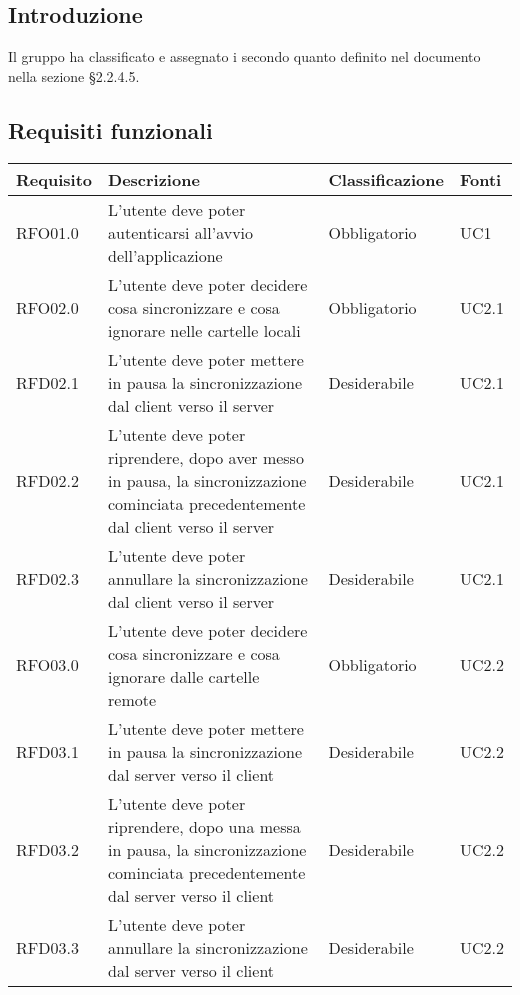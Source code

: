 \subsection{Introduzione}
Il gruppo \gruppo{} ha classificato e assegnato i  secondo quanto definito nel documento \NdP{} \versNdP{} nella sezione \S{}2.2.4.5.

\subsection{Requisiti funzionali}
{
    \setlength{\freewidth}{\dimexpr\textwidth-8\tabcolsep}
    \renewcommand{\arraystretch}{1.5}
    \centering
    \setlength{\aboverulesep}{0pt}
    \setlength{\belowrulesep}{0pt}
    \begin{longtable}{C{.20\freewidth} C{.40\freewidth} C{.20\freewidth} C{.20\freewidth}}
        \toprule 
        \textbf{Requisito} & \textbf{Descrizione} & \textbf{Classificazione} & \textbf{Fonti} \\
        \toprule
        \endhead

        RFO01.0  & L'utente deve poter autenticarsi all'avvio dell'applicazione & Obbligatorio & UC1 \\

        RFO02.0  & L'utente deve poter decidere cosa sincronizzare e cosa ignorare nelle cartelle locali & Obbligatorio & UC2.1 \\
        RFD02.1  & L'utente deve poter mettere in pausa la sincronizzazione dal client verso il server & Desiderabile & UC2.1 \\
        RFD02.2  & L'utente deve poter riprendere, dopo aver messo in pausa, la sincronizzazione cominciata precedentemente dal client verso il server & Desiderabile & UC2.1 \\
        RFD02.3  & L'utente deve poter annullare la sincronizzazione dal client verso il server & Desiderabile & UC2.1 \\

        RFO03.0  & L'utente deve poter decidere cosa sincronizzare e cosa ignorare dalle cartelle remote & Obbligatorio & UC2.2 \\
        RFD03.1  & L'utente deve poter mettere in pausa la sincronizzazione dal server verso il client & Desiderabile & UC2.2 \\
        RFD03.2  & L'utente deve poter riprendere, dopo una messa in pausa, la sincronizzazione cominciata precedentemente dal server verso il client & Desiderabile & UC2.2 \\
        RFD03.3  & L'utente deve poter annullare la sincronizzazione dal server verso il client & Desiderabile & UC2.2 \\


\end{longtable}}
